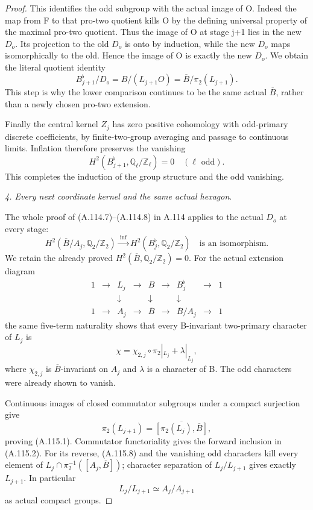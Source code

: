 \begin{proof}
This identifies the odd subgroup with the actual image of O. Indeed the map from F to that pro-two quotient kills O by the defining universal property of the maximal pro-two quotient. Thus the image of O at stage j+1 lies in the new \(D_o\). Its projection to the old \(D_o\) is onto by induction, while the new \(D_o\) maps isomorphically to the old. Hence the image of O is exactly the new \(D_o\). We obtain the literal quotient identity
\[
B_{j+1}^\flat/D_o
 =B/(L_{j+1}O)=\overline B/\pi_2(L_{j+1}).                   \tag{A.115.6}
\]
This step is why the lower comparison continues to be the same actual \(\overline B\), rather than a newly chosen pro-two extension.

Finally the central kernel \(Z_j\) has zero positive cohomology with odd-primary discrete coefficients, by finite-two-group averaging and passage to continuous limits. Inflation therefore preserves the vanishing
\[
H^2(B_{j+1}^\flat,\mathbb Q_\ell/\mathbb Z_\ell)=0
\quad(\ell\text{ odd}).
\]
This completes the induction of the group structure and the odd vanishing.

\medskip\noindent\emph{4. Every next coordinate kernel and the same actual hexagon}.

The whole proof of (A.114.7)--(A.114.8) in A.114 applies to the actual \(D_o\) at every stage:
\[
H^2(\overline B/A_j,\mathbb Q_2/\mathbb Z_2)
 \xrightarrow{\ \mathrm{inf}\ }
H^2(B_j^\flat,\mathbb Q_2/\mathbb Z_2)
\quad\text{is an isomorphism}.                              \tag{A.115.7}
\]
We retain the already proved
\(H^2(\overline B,\mathbb Q_2/\mathbb Z_2)=0\).
For the actual extension diagram
\[
\begin{array}{ccccccccc}
1&\to&L_j&\to&B&\to&B_j^\flat&\to&1\\
 &&\downarrow&&\downarrow&&\downarrow\\
1&\to&A_j&\to&\overline B&\to&\overline B/A_j&\to&1
\end{array}
\]
the same five-term naturality shows that every B-invariant two-primary character of \(L_j\) is
\[
\chi=\chi_{2,j}\circ\pi_2|_{L_j}+\lambda|_{L_j},              \tag{A.115.8}
\]
where \(\chi_{2,j}\) is \(\overline B\)-invariant on \(A_j\) and \(\lambda\) is a character of B. The odd characters were already shown to vanish.

Continuous images of closed commutator subgroups under a compact surjection give
\[
\pi_2(L_{j+1})
 =\overline{[\pi_2(L_j),\overline B]},
\]
proving (A.115.1). Commutator functoriality gives the forward inclusion in (A.115.2). For its reverse, (A.115.8) and the vanishing odd characters kill every element of
\(L_j\cap\pi_2^{-1}([A_j,\overline B])\); character separation of \(L_j/L_{j+1}\) gives exactly \(L_{j+1}\). In particular
\[
L_j/L_{j+1}\simeq A_j/A_{j+1}
\]
as actual compact groups.


\end{proof}
